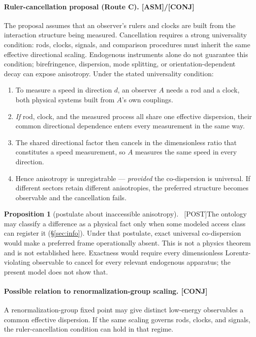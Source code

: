 \documentclass[11pt]{article}
\newcommand{\asm}{\textcolor{blue!70!black}{\textsf{\small[ASM]}}}
\newcommand{\conj}{\textcolor{orange!80!black}{\textsf{\small[CONJ]}}}
\newcommand{\post}{\textcolor{purple!70!black}{\textsf{\small[POST]}}}
\newcommand{\gap}{\textcolor{red!75!black}{\textsf{\small[GAP]}}}
\def\conj{[CONJ]}\def\post{[POST]}\def\gap{[GAP]}%
\theoremstyle{definition}
\newtheorem{proposition}{Proposition}[section]
\theoremstyle{remark}
\begin{document}
\paragraph{Ruler-cancellation proposal (Route C). \asm/\conj}
The proposal assumes that an observer's rulers and clocks are built from the interaction structure being measured. Cancellation requires a strong universality condition: rods, clocks, signals, and comparison procedures must inherit the same effective directional scaling. Endogenous instruments alone do not guarantee this condition; birefringence, dispersion, mode splitting, or orientation-dependent decay can expose anisotropy. Under the stated universality condition:

\begin{enumerate}[leftmargin=1.6em, itemsep=2pt, topsep=2pt]
  \item To measure a speed in direction $d$, an observer $A$ needs a rod and a clock, both physical systems built from $A$'s own couplings.
  \item \emph{If} rod, clock, and the measured process all share one effective dispersion, their common directional dependence enters every measurement in the same way.
  \item The shared directional factor then cancels in the dimensionless ratio that constitutes a speed measurement, so $A$ measures the same speed in every direction.
  \item Hence anisotropy is unregistrable --- \emph{provided} the co-dispersion is universal. If different sectors retain different anisotropies, the preferred structure becomes observable and the cancellation fails.
\end{enumerate}

\begin{proposition}[postulate about inaccessible anisotropy]{\normalfont\ \post}\label{prop:unreg}
The ontology may classify a difference as a physical fact only when some modeled access class can register it (\S\ref{sec:info}). Under that postulate, exact universal co-dispersion would make a preferred frame operationally absent. This is not a physics theorem and is not established here. Exactness would require every dimensionless Lorentz-violating observable to cancel for every relevant endogenous apparatus; the present model does not show that.
\end{proposition}

\paragraph{Possible relation to renormalization-group scaling. \conj}
A renormalization-group fixed point may give distinct low-energy observables a common effective dispersion. If the same scaling governs rods, clocks, and signals, the ruler-cancellation condition can hold in that regime.
\end{document}
